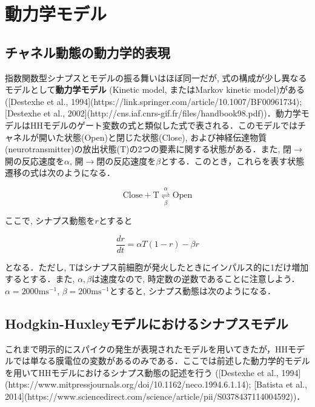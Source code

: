 \section{動力学モデル}
\subsection{チャネル動態の動力学的表現}
指数関数型シナプスとモデルの振る舞いはほぼ同一だが, 式の構成が少し異なるモデルとして\textbf{動力学モデル} (Kinetic model, またはMarkov kinetic model)がある ([Destexhe et al., 1994](https://link.springer.com/article/10.1007/BF00961734); [Destexhe et al., 2002](http://cns.iaf.cnrs-gif.fr/files/handbook98.pdf))．動力学モデルはHHモデルのゲート変数の式と類似した式で表される．このモデルではチャネルが開いた状態(Open)と閉じた状態(Close), および神経伝達物質(neurotransmitter)の放出状態(T)の2つの要素に関する状態がある．また, 閉$\to$開の反応速度を$\alpha$, 開$\to$閉の反応速度を$\beta$とする．このとき，これらを表す状態遷移の式は次のようになる．


\begin{equation}
\text{Close}+\text{T}  \underset{\beta}{\overset{\alpha}{\rightleftharpoons}}\text{Open}    
\end{equation}


ここで, シナプス動態を$r$とすると


\begin{equation}
\frac{dr}{dt}=\alpha T (1-r) - \beta r
\end{equation}


となる．ただし, Tはシナプス前細胞が発火したときにインパルス的に1だけ増加するとする．また, $\alpha, \beta$は速度なので, 時定数の逆数であることに注意しよう． $\alpha=2000 \text{ms}^{-1}$, $\beta=200 \text{ms}^{-1}$とすると, シナプス動態は次のようになる．



\subsection{Hodgkin-Huxleyモデルにおけるシナプスモデル}
これまで明示的にスパイクの発生が表現されたモデルを用いてきたが，HHモデルでは単なる膜電位の変数があるのみである．ここでは前述した動力学的モデルを用いてHHモデルにおけるシナプス動態の記述を行う ([Destexhe et al., 1994](https://www.mitpressjournals.org/doi/10.1162/neco.1994.6.1.14); [Batista et al., 2014](https://www.sciencedirect.com/science/article/pii/S0378437114004592))．

